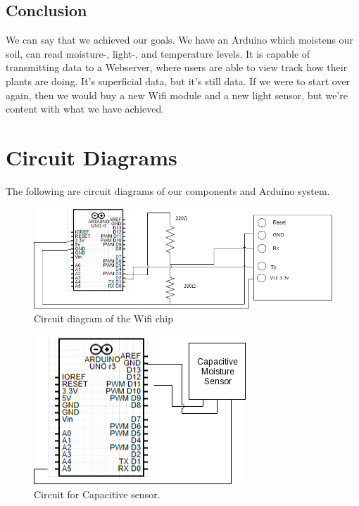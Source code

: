 \documentclass[a4paper,12pt,oneside,openright,titlepage]{book}
\begin{document}
\section{Conclusion}
We can say that we achieved our goals. We have an Arduino which moistens our soil, can read moisture-, light-, and temperature levels. It is capable of transmitting data to a Webserver, where users are able to view track how their plants are doing. It's superficial data, but it's still data. If we were to start over again, then we would buy a new Wifi module and a new light sensor, but we're content with what we have achieved.
\appendix
\chapter{Circuit Diagrams}
The following are circuit diagrams of our components and Arduino system.
\begin{figure}[!ht]
  \centering
      \includegraphics[scale=0.8]{Circuit-Diagram-Wifi-8266}
  \caption{Circuit diagram of the Wifi chip}
  \label{fig:Wifi Circuit}
\end{figure}

\begin{figure}[!ht]
  \centering
      \includegraphics[scale=0.9]{Capacitive}
  \caption{Circuit for Capacitive sensor.}
  \label{fig:CapacitiveCircuit}
\end{figure}
\end{document}
